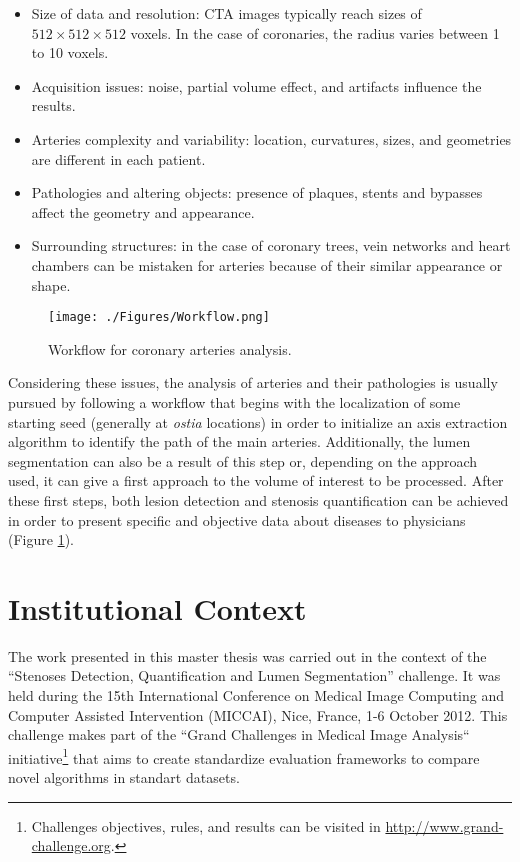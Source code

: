 \begin{itemize}
	\item Size of data and resolution: CTA images typically reach sizes of $512\times512\times512$ voxels. In the case of coronaries, the radius varies between 1 to 10 voxels.	
	\item Acquisition issues: noise, partial volume effect, and artifacts influence the results.	
	\item Arteries complexity and variability: location, curvatures, sizes, and geometries are different in each patient.
	\item Pathologies and altering objects: presence of plaques, stents and bypasses affect the geometry and appearance.
	\item Surrounding structures: in the case of coronary trees, vein networks and heart chambers can be mistaken for arteries because of their similar appearance or shape. 
\end{itemize}

\begin{figure}[htbp]
	\centering
		\texttt{[image: ./Figures/Workflow.png]}
	\caption[Workflow for coronary arteries analysis.]{Workflow for coronary arteries analysis.}
	\label{fig:Workflow}
\end{figure}

Considering these issues, the analysis of arteries and their pathologies is usually pursued by following a workflow that begins with the localization of some starting seed (generally at \textit{ostia} locations) in order to initialize an axis extraction algorithm to identify the path of the main arteries. Additionally, the lumen segmentation can also be a result of this step or, depending on the approach used, it can give a first approach to the volume of interest to be processed. After these first steps, both lesion detection and stenosis quantification can be achieved in order to present specific and objective data about diseases to physicians (Figure \ref{fig:Workflow}).

\section{Institutional Context}
%

The work presented in this master thesis was carried out in the context of the ``Stenoses Detection, Quantification and Lumen Segmentation'' challenge. It was held during the 15th International Conference on Medical Image Computing and Computer Assisted Intervention (MICCAI), Nice, France, 1-6 October 2012. This challenge makes part of the ``Grand Challenges in Medical Image Analysis`` initiative\footnote{Challenges objectives, rules, and results can be visited in \href{http://www.grand-challenge.org}{http://www.grand-challenge.org}.} that aims to create standardize evaluation frameworks to compare novel algorithms in standart datasets.

